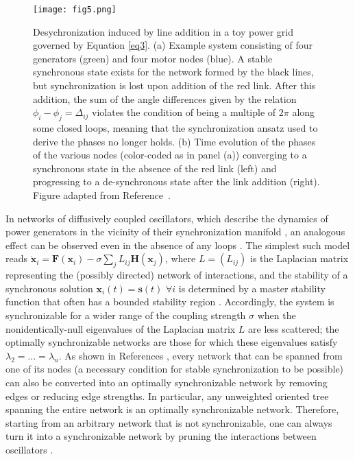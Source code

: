 \documentclass[
preprint,
superscriptaddress,
aps,
prl,
]{revtex4-1}
\begin{document}
\begin{figure}[h]
\texttt{[image: fig5.png]}
\caption{Desychronization induced by line addition in a toy power grid governed by  Equation \ref{eq3}.
(a) Example system consisting of four generators (green) and  four motor nodes (blue). A  stable synchronous state 
exists for the network formed by the black lines, but synchronization is lost upon addition
of the red link. 
After this addition, the  sum of the angle differences  
 given by the relation $\phi_i-\phi_j = \Delta_{ij}$ 
violates the condition of being a multiple of  $2\pi$  along some closed loops,  
meaning that the synchronization ansatz used to derive the phases no longer holds.
(b) Time evolution of the phases of the various nodes (color-coded as in  panel (a)) converging to a synchronous state in the absence of the red link (left) and progressing to a de-synchronous state after the link addition (right).
Figure adapted from Reference~\cite{witthaut2012braess}.
}
\label{fig5}
\end{figure}


In networks of diffusively coupled oscillators, which describe the dynamics of power generators in the vicinity of their synchronization manifold \cite{motter2013spontaneous}, an analogous effect can be observed even in the  absence of any loops  \cite{nishikawa2006synchronization}.  The simplest such model reads $\dot{\boldsymbol x}_i ={\boldsymbol F}({\boldsymbol x}_i) -\sigma\sum_j L_{ij} {\boldsymbol H} ({\boldsymbol x}_j) $, where  $L=(L_{ij})$ is the Laplacian matrix representing the (possibly directed) network of interactions, and the stability of a synchronous solution ${\boldsymbol x}_i(t)= {\boldsymbol s}(t)$ $\forall i$ is  determined by a master stability function that often has a  bounded stability region \cite{pecora1998master,nishikawa2006maximum}. Accordingly, 
the system is synchronizable for a wider range of 
{\color{black} the} coupling strength  $\sigma$ when the nonidentically-null eigenvalues of the Laplacian matrix $L$ are less scattered; the optimally synchronizable networks are those for which these eigenvalues satisfy $\lambda_2=\dots =\lambda_n$. As shown in References \cite{nishikawa2006synchronization,nishikawa2006maximum}, 
every network that can be spanned from one of its nodes (a necessary condition for stable synchronization to be possible) can also be converted into an optimally synchronizable network by removing edges or reducing edge strengths. In particular, any unweighted oriented tree spanning the entire network is an optimally synchronizable network. Therefore, starting from an arbitrary network that is not synchronizable, one can always turn it into a synchronizable network by pruning the interactions between oscillators \cite{nishikawa2006maximum}.
\end{document}

